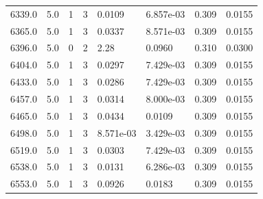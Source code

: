 \documentclass[preview]{standalone}
\begin{document}
{{{{{{\begin{tabular}{L{1.2cm}C{1.2cm} C{0.3cm}C{0.5cm} C{1.4cm}C{1.4cm} C{1.4cm}C{1.4cm}}
  6339.0  &   5.0  & 1     &  3 &  0.0109  & 6.857e-03  & 0.309 &  0.0155   \\ 
  6365.0  &   5.0  & 1     &  3 &  0.0337  & 8.571e-03  & 0.309 &  0.0155   \\ 
  6396.0  &   5.0  & 0     &  2 &  2.28  & 0.0960  & 0.310 &  0.0300   \\ 
  6404.0  &   5.0  & 1     &  3 &  0.0297  & 7.429e-03  & 0.309 &  0.0155   \\ 
  6433.0  &   5.0  & 1     &  3 &  0.0286  & 7.429e-03  & 0.309 &  0.0155   \\ 
  6457.0  &   5.0  & 1     &  3 &  0.0314  & 8.000e-03  & 0.309 &  0.0155   \\ 
  6465.0  &   5.0  & 1     &  3 &  0.0434  & 0.0109  & 0.309 &  0.0155   \\ 
  6498.0  &   5.0  & 1     &  3 &  8.571e-03  & 3.429e-03  & 0.309 &  0.0155   \\ 
  6519.0  &   5.0  & 1     &  3 &  0.0303  & 7.429e-03  & 0.309 &  0.0155   \\ 
  6538.0  &   5.0  & 1     &  3 &  0.0131  & 6.286e-03  & 0.309 &  0.0155   \\ 
  6553.0  &   5.0  & 1     &  3 &  0.0926  & 0.0183  & 0.309 &  0.0155   \\ 
\hline 
\end{tabular} 

}}}}}}
\end{document}
